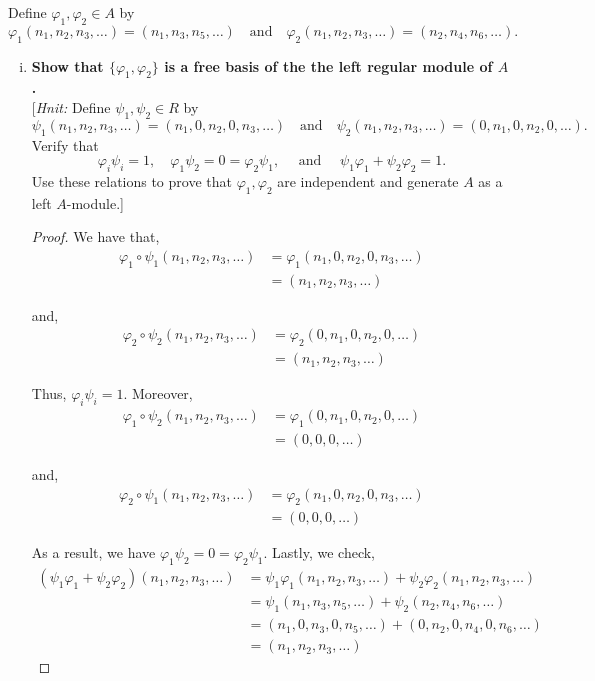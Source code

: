 \documentclass[11pt, reqno]{amsart}
\theoremstyle{plain}
\theoremstyle{definition}
\theoremstyle{example}
\def\f{\varphi}
\begin{document}
\begin{enumerate}[1.]
\begin{enumerate}
Define $\f_1, \f_2 \in A$ by 
$$\f_1(n_1, n_2, n_3, \dots) = (n_1, n_3, n_5, \dots) \quad \text{and} \quad 
	\f_2(n_1, n_2, n_3, \dots) = (n_2, n_4, n_6, \dots).$$



\begin{enumerate}[(i)]
\item \textbf{Show that $\{\f_1, \f_2\}$ is a free basis of the the left regular module of $A$.}\\
{[\emph{Hnit:} Define $\psi_1, \psi_2 \in R$ by 
$$\psi_1(n_1, n_2, n_3, \dots) = (n_1, 0, n_2, 0, n_3, \dots) \quad \text{and} \quad 
	\psi_2(n_1, n_2, n_3, \dots) = (0, n_1, 0, n_2, 0, \dots).$$
Verify that 
$$\f_i \psi_i = 1, \quad \f_1 \psi_2 = 0 = \f_2 \psi_1, \quad \text{ and } \quad 
	\psi_1 \f_1 + \psi_2 \f_2 = 1.$$
	Use these relations to prove that $\f_1, \f_2$ are independent and generate $A$ as a left $A$-module.]}
	
	
\begin{proof}
We have that,
\begin{align*}
\varphi_1 \circ \psi_1 (n_1, n_2, n_3, \ldots) &= \varphi_1 (n_1, 0, n_2, 0, n_3, \ldots)\\
&= (n_1, n_2, n_3, \ldots)
\end{align*}

and,
\begin{align*}
\varphi_2 \circ \psi_2 (n_1, n_2, n_3, \ldots) &= \varphi_2(0, n_1, 0, n_2, 0, \ldots)\\
&= (n_1, n_2, n_3, \ldots)
\end{align*}

Thus, $\varphi_i \psi_i = 1$. Moreover,
\begin{align*}
\varphi_1 \circ \psi_2 (n_1, n_2, n_3, \ldots) &= \varphi_1(0, n_1, 0, n_2, 0, \ldots)\\
&= (0, 0, 0, \ldots)
\end{align*}

and,
\begin{align*}
\varphi_2 \circ \psi_1 (n_1, n_2, n_3, \ldots) &= \varphi_2(n_1, 0, n_2, 0, n_3, \ldots)\\
&= (0, 0, 0, \ldots)
\end{align*}

As a result, we have $\varphi_1 \psi_2 = 0 = \varphi_2 \psi_1$. Lastly, we check,
\begin{align*}
(\psi_1 \varphi_1 + \psi_2\varphi_2)(n_1, n_2, n_3, \ldots) &= \psi_1 \varphi_1(n_1, n_2, n_3, \ldots) + \psi_2\varphi_2(n_1, n_2, n_3, \ldots)\\
&= \psi_1(n_1, n_3, n_5, \ldots) + \psi_2(n_2, n_4, n_6, \ldots)\\
&= (n_1, 0, n_3, 0, n_5, \ldots) + (0, n_2, 0, n_4, 0, n_6, \ldots)\\
&= (n_1, n_2, n_3, \ldots)
\end{align*}


\end{proof}
\end{enumerate}
\end{enumerate}
\end{enumerate}
\end{document}
